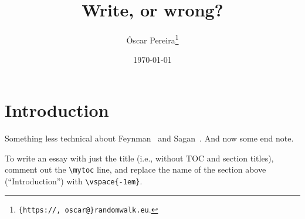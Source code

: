 \documentclass[a4paper,12pt,dvipsnames*]{article}
\title{
Write, or wrong?
}
\author{%
Óscar Pereira\footnote{\texttt{\{https://, oscar@\}randomwalk.eu}.}
}
\date{{\small\today}\vspace{-2em}}
\begin{document}
\maketitle

\mytoc

\section{Introduction}
  \label{sec:intro}
  Something less technical about Feynman~\cite{Feynman74} and Sagan~\cite{Sagan}. And now some end note.

  To write an essay with just the title (i.e., without TOC and section titles), comment out the \verb+\mytoc+ line, and replace the name of the section above (``Introduction'') with \verb+\vspace{-1em}+.

{}
\printpostnotes

{}


\end{document}

